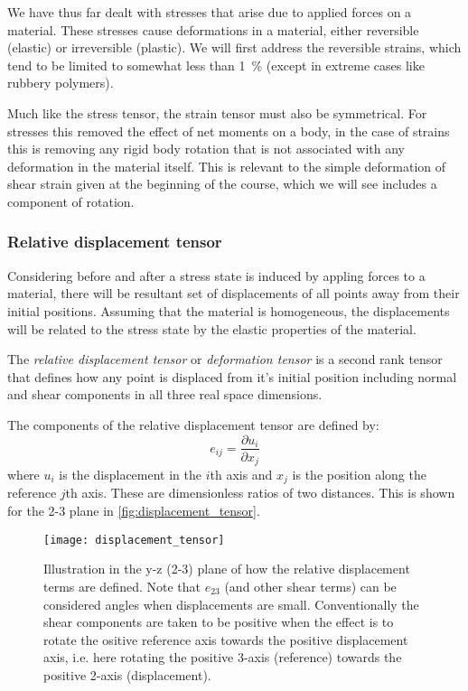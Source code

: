 We have thus far dealt with stresses that arise due to applied forces on a material. These stresses cause deformations in a material, either reversible (elastic) or irreversible (plastic). We will first address the reversible strains, which tend to be limited to somewhat less than \SI{1}{\percent} (except in extreme cases like rubbery polymers).

Much like the stress tensor, the strain tensor must also be symmetrical. For stresses this removed the effect of net moments on a body, in the case of strains this is removing any rigid body rotation that is not associated with any deformation in the material itself. This is relevant to the simple deformation of shear strain given at the beginning of the course, which we will see includes a component of rotation.

\subsubsection{Relative displacement tensor}

Considering before and after a stress state is induced by  appling forces to a material, there will be resultant set of displacements of all points away from their initial positions. Assuming that the material is homogeneous, the displacements will be related to the stress state by the elastic properties of the material.

The \emph{relative displacement tensor} or \emph{deformation tensor} is a second rank tensor that defines how any point is displaced from it's initial position including normal and shear components in all three real space dimensions.

The components of the relative displacement tensor are defined by:
\begin{equation}
e_{ij} = \frac{\partial u_i}{\partial x_j}
\end{equation}
where $u_i$ is the displacement in the $i$th axis and $x_j$ is the position along the reference $j$th axis. These are dimensionless ratios of two distances. This is shown for the 2-3 plane in \autoref{fig:displacement_tensor}.
\FloatBarrier

\begin{figure}[h!]
\centering
\texttt{[image: displacement\_tensor]}
\caption{Illustration in the y-z (2-3) plane of how the relative displacement terms are defined. Note that $e_{23}$ (and other shear terms) can be considered angles when displacements are small. Conventionally the shear components are taken to be positive when the effect is to rotate the ositive reference axis towards the positive displacement axis, i.e. here rotating the positive 3-axis (reference) towards the positive 2-axis (displacement).\label{fig:displacement_tensor}}
\end{figure}

